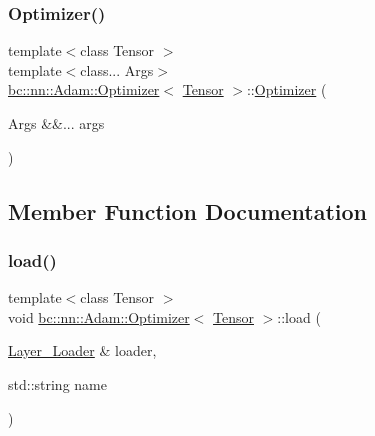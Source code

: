 \subsubsection{\texorpdfstring{Optimizer()}{Optimizer()}}
{\footnotesize\ttfamily template$<$class Tensor $>$ \\
template$<$class... Args$>$ \\
\hyperlink{structbc_1_1nn_1_1Adam_1_1Optimizer}{bc\+::nn\+::\+Adam\+::\+Optimizer}$<$ \hyperlink{namespacebc_a659391e47ab612be3ba6c18cf9c89159}{Tensor} $>$\+::\hyperlink{structbc_1_1nn_1_1Adam_1_1Optimizer}{Optimizer} (\begin{DoxyParamCaption}\item[{Args \&\&...}]{args }\end{DoxyParamCaption})\hspace{0.3cm}{\ttfamily [inline]}}



\subsection{Member Function Documentation}
\mbox{\label{structbc_1_1nn_1_1Adam_1_1Optimizer_a6f2a8ae5cbfc888476d90b1edc44d0d8}} 
\subsubsection{\texorpdfstring{load()}{load()}}
{\footnotesize\ttfamily template$<$class Tensor $>$ \\
void \hyperlink{structbc_1_1nn_1_1Adam_1_1Optimizer}{bc\+::nn\+::\+Adam\+::\+Optimizer}$<$ \hyperlink{namespacebc_a659391e47ab612be3ba6c18cf9c89159}{Tensor} $>$\+::load (\begin{DoxyParamCaption}\item[{\hyperlink{structbc_1_1nn_1_1Layer__Loader}{Layer\+\_\+\+Loader} \&}]{loader,  }\item[{std\+::string}]{name }\end{DoxyParamCaption})\hspace{0.3cm}{\ttfamily [inline]}}

\mbox{\label{structbc_1_1nn_1_1Adam_1_1Optimizer_ae205dfb8c1c21f0885660fcafeeaa4b8}} 
